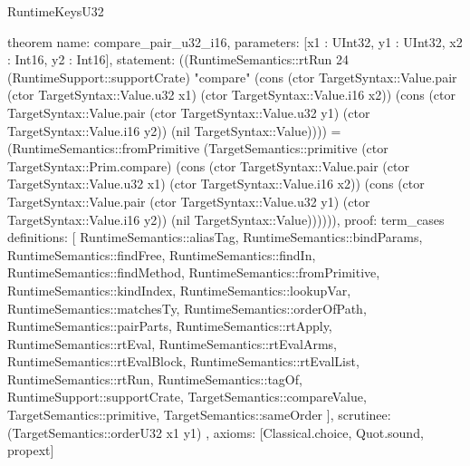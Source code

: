 \begin{lexlean}{RuntimeKeysU32}
\begin{semanticmodule}
theorem{
  name: compare_pair_u32_i16,
  parameters: [x1 : UInt32, y1 : UInt32, x2 : Int16, y2 : Int16],
  statement: ((RuntimeSemantics::rtRun 24 (RuntimeSupport::supportCrate) "compare" (cons (ctor TargetSyntax::Value.pair (ctor TargetSyntax::Value.u32 x1) (ctor TargetSyntax::Value.i16 x2)) (cons (ctor TargetSyntax::Value.pair (ctor TargetSyntax::Value.u32 y1) (ctor TargetSyntax::Value.i16 y2)) (nil TargetSyntax::Value)))) = (RuntimeSemantics::fromPrimitive (TargetSemantics::primitive (ctor TargetSyntax::Prim.compare) (cons (ctor TargetSyntax::Value.pair (ctor TargetSyntax::Value.u32 x1) (ctor TargetSyntax::Value.i16 x2)) (cons (ctor TargetSyntax::Value.pair (ctor TargetSyntax::Value.u32 y1) (ctor TargetSyntax::Value.i16 y2)) (nil TargetSyntax::Value)))))),
  proof: term_cases{
    definitions: [
      RuntimeSemantics::aliasTag,
      RuntimeSemantics::bindParams,
      RuntimeSemantics::findFree,
      RuntimeSemantics::findIn,
      RuntimeSemantics::findMethod,
      RuntimeSemantics::fromPrimitive,
      RuntimeSemantics::kindIndex,
      RuntimeSemantics::lookupVar,
      RuntimeSemantics::matchesTy,
      RuntimeSemantics::orderOfPath,
      RuntimeSemantics::pairParts,
      RuntimeSemantics::rtApply,
      RuntimeSemantics::rtEval,
      RuntimeSemantics::rtEvalArms,
      RuntimeSemantics::rtEvalBlock,
      RuntimeSemantics::rtEvalList,
      RuntimeSemantics::rtRun,
      RuntimeSemantics::tagOf,
      RuntimeSupport::supportCrate,
      TargetSemantics::compareValue,
      TargetSemantics::primitive,
      TargetSemantics::sameOrder
    ],
    scrutinee: (TargetSemantics::orderU32 x1 y1)
  },
  axioms: [Classical.choice, Quot.sound, propext]
}


\end{semanticmodule}
\end{lexlean}
